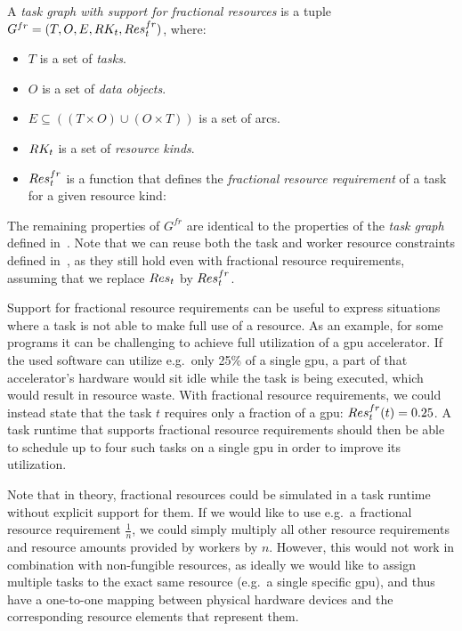 \vspace{2mm} A
\emph{task graph with support for fractional resources} is a tuple \\
$G^{fr} = (T, O, E, RK_t, Res_t^{fr})$, where:
\begin{itemize}[itemsep=0pt]
	\item $T$ is a set of \emph{tasks}.
	\item $O$ is a set of \emph{data objects}.
	\item $E \subseteq ((T\times{}O) \cup (O\times{}T))$ is a set of arcs.
	\item $RK_t$ is a set of \emph{resource kinds}.
	\item $Res_t^{fr}$ is a function that defines the
	      \emph{fractional resource requirement} of a task for a given resource kind: \\
\end{itemize}

The remaining properties of $G^{fr}$ are identical to the properties of the
\emph{task graph} defined in~. Note that we can reuse both the task
and worker resource constraints defined in~, as they still hold even with
fractional resource requirements, assuming that we replace $Res_t$ by
$Res_t^{fr}$.

Support for fractional resource requirements can be useful to express situations where a task is
not able to make full use of a resource. As an example, for some programs it can be challenging to
achieve full utilization of a \gls{gpu} accelerator. If the used software can utilize
e.g.\ only 25\% of a single \gls{gpu}, a part of that accelerator's hardware would
sit idle while the task is being executed, which would result in resource waste. With fractional
resource requirements, we could instead state that the task $t$ requires only a
fraction of a \gls{gpu}: $Res_t^{fr}(t) = 0.25$. A task runtime that supports
fractional resource requirements should then be able to schedule up to four such tasks on a single
\gls{gpu} in order to improve its utilization.

Note that in theory, fractional resources could be simulated in a task runtime without explicit
support for them. If we would like to use e.g.\ a fractional resource requirement
$\frac{1}{n}$, we could simply multiply all other resource requirements and resource
amounts provided by workers by $n$. However, this would not work in combination
with non-fungible resources, as ideally we would like to assign multiple tasks to the exact same
resource (e.g.\ a single specific \gls{gpu}), and thus have a one-to-one mapping
between physical hardware devices and the corresponding resource elements that represent them.

